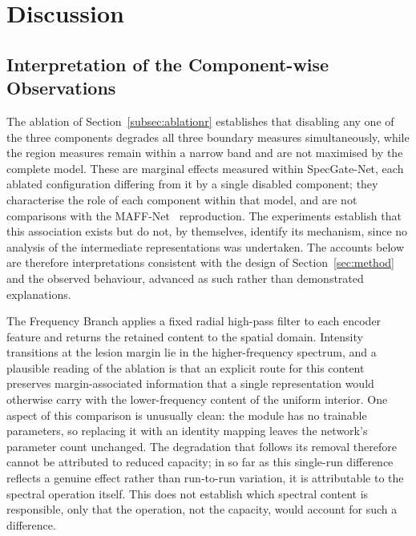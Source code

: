 \section{Discussion}
\label{sec:discussion}

\subsection{Interpretation of the Component-wise Observations}

The ablation of Section~\ref{subsec:ablationr} establishes that disabling any one of the three components degrades all three boundary measures simultaneously, while the region measures remain within a narrow band and are not maximised by the complete model. These are marginal effects measured within SpecGate-Net, each ablated configuration differing from it by a single disabled component; they characterise the role of each component within that model, and are not comparisons with the MAFF-Net~\cite{ref15} reproduction. The experiments establish that this association exists but do not, by themselves, identify its mechanism, since no analysis of the intermediate representations was undertaken. The accounts below are therefore interpretations consistent with the design of Section~\ref{sec:method} and the observed behaviour, advanced as such rather than demonstrated explanations.

The Frequency Branch applies a fixed radial high-pass filter to each encoder feature and returns the retained content to the spatial domain. Intensity transitions at the lesion margin lie in the higher-frequency spectrum, and a plausible reading of the ablation is that an explicit route for this content preserves margin-associated information that a single representation would otherwise carry with the lower-frequency content of the uniform interior. One aspect of this comparison is unusually clean: the module has no trainable parameters, so replacing it with an identity mapping leaves the network's parameter count unchanged. The degradation that follows its removal therefore cannot be attributed to reduced capacity; in so far as this single-run difference reflects a genuine effect rather than run-to-run variation, it is attributable to the spectral operation itself. This does not establish which spectral content is responsible, only that the operation, not the capacity, would account for such a difference.


